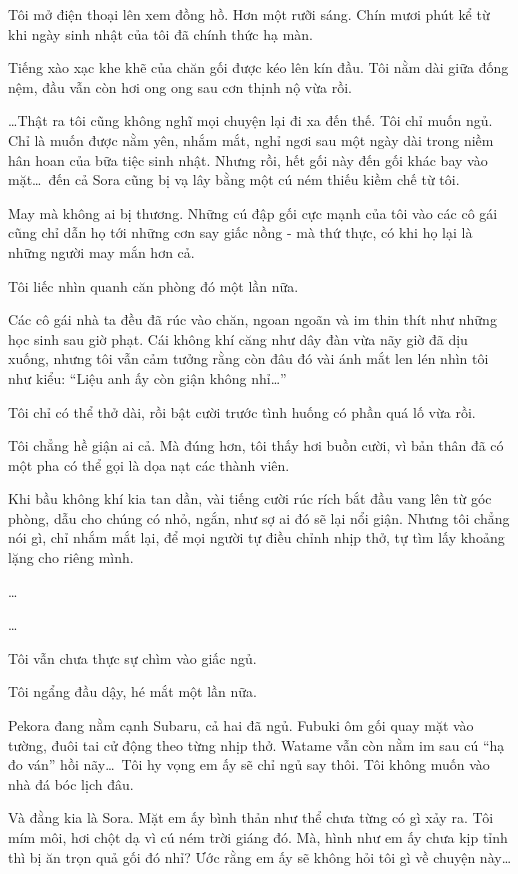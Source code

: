 \documentclass[../main.tex]{subfiles}
\begin{document}
Tôi mở điện thoại lên xem đồng hồ. Hơn một rưỡi sáng. Chín mươi phút kể từ khi ngày sinh nhật của tôi đã chính thức hạ màn.

Tiếng xào xạc khe khẽ của chăn gối được kéo lên kín đầu. Tôi nằm dài giữa đống nệm, đầu vẫn còn hơi ong ong sau cơn thịnh nộ vừa rồi.

\dots Thật ra tôi cũng không nghĩ mọi chuyện lại đi xa đến thế. Tôi chỉ muốn ngủ. Chỉ là muốn được nằm yên, nhắm mắt, nghỉ ngơi sau một ngày dài trong niềm hân hoan của bữa tiệc sinh nhật. Nhưng rồi, hết gối này đến gối khác bay vào mặt\dots\ đến cả Sora cũng bị vạ lây bằng một cú ném thiếu kiềm chế từ tôi.

May mà không ai bị thương. Những cú đập gối cực mạnh của tôi vào các cô gái cũng chỉ dẫn họ tới những cơn say giấc nồng - mà thứ thực, có khi họ lại là những người may mắn hơn cả.

Tôi liếc nhìn quanh căn phòng đó một lần nữa.

Các cô gái nhà ta đều đã rúc vào chăn, ngoan ngoãn và im thin thít như những học sinh sau giờ phạt. Cái không khí căng như dây đàn vừa nãy giờ đã dịu xuống, nhưng tôi vẫn cảm tưởng rằng còn đâu đó vài ánh mắt len lén nhìn tôi như kiểu: ``Liệu anh ấy còn giận không nhỉ\dots''

Tôi chỉ có thể thở dài, rồi bật cười trước tình huống có phần quá lố vừa rồi.

Tôi chẳng hề giận ai cả. Mà đúng hơn, tôi thấy hơi buồn cười, vì bản thân đã có một pha có thể gọi là dọa nạt các thành viên.

Khi bầu không khí kia tan dần, vài tiếng cười rúc rích bắt đầu vang lên từ góc phòng, dẫu cho chúng có nhỏ, ngắn, như sợ ai đó sẽ lại nổi giận. Nhưng tôi chẳng nói gì, chỉ nhắm mắt lại, để mọi người tự điều chỉnh nhịp thở, tự tìm lấy khoảng lặng cho riêng mình.

\dots

\dots

Tôi vẫn chưa thực sự chìm vào giấc ngủ.

Tôi ngẩng đầu dậy, hé mắt một lần nữa.

Pekora đang nằm cạnh Subaru, cả hai đã ngủ. Fubuki ôm gối quay mặt vào tường, đuôi tai cử động theo từng nhịp thở. Watame vẫn còn nằm im sau cú ``hạ đo ván'' hồi nãy\dots\ Tôi hy vọng em ấy sẽ chỉ ngủ say thôi. Tôi không muốn vào nhà đá bóc lịch đâu.

Và đằng kia là Sora. Mặt em ấy bình thản như thể chưa từng có gì xảy ra. Tôi mím môi, hơi chột dạ vì cú ném trời giáng đó. Mà, hình như em ấy chưa kịp tỉnh thì bị ăn trọn quả gối đó nhỉ? Ước rằng em ấy sẽ không hỏi tôi gì về chuyện này\dots
\end{document}
